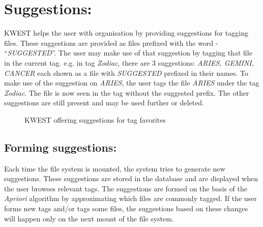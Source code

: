 \section{Suggestions:}
KWEST helps the user with organisation by providing suggestions for tagging files. These suggestions are provided as files prefixed with the word - ``\textit{SUGGESTED}''. The user may make use of that suggestion by tagging that file in the current tag. \newline
e.g. in tag \textit{Zodiac}, there are 3 suggestions: \textit{ARIES, GEMINI, CANCER} each shown as a file with \textit{SUGGESTED} prefixed in their names. To make use of the suggestion on \textit{ARIES}, the user tags the file \textit{ARIES} under the tag \textit{Zodiac}. The file is now seen in the tag without the suggested prefix. The other suggestions are still present and may be used further or deleted.
\begin{figure}[htb]
\centering
\setlength\fboxsep{0pt}
\setlength\fboxrule{0.5pt}
\caption{KWEST offering suggestions for tag favorites}
\label{fig:dfd0}
\end{figure}

\subsection*{Forming suggestions:}
Each time the file system is mounted, the system tries to generate new suggestions. These suggestions are stored in the database and are displayed when the user browses relevant tags. The suggestions are formed on the basis of the \textit{Apriori} algorithm by approximating which files are commonly tagged. If the user forms new tags and/or tags some files, the suggestions based on these changes will happen only on the next mount of the file system.

